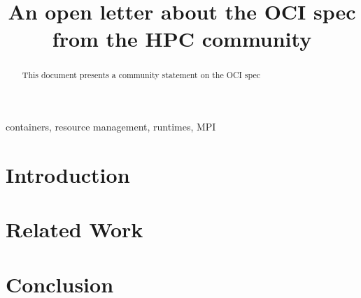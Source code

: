 \documentclass[conference]{IEEEtran}
\begin{document}
\title{An open letter about the OCI spec from the HPC community}

\author{
}

\maketitle

\begin{abstract}
This document presents a community statement on the OCI spec
\end{abstract}

\begin{IEEEkeywords}
containers, resource management, runtimes, MPI
\end{IEEEkeywords}

\section{Introduction}

\section{Related Work}
\label{sec:background}


\section{Conclusion}
\label{sec:conclusion}




\end{document}
